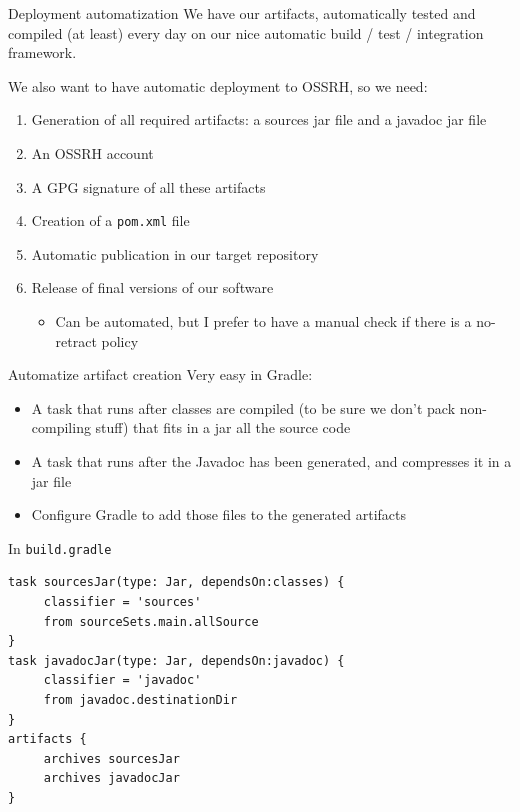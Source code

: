 \documentclass[presentation]{beamer}
\begin{document}
\begin{frame}[fragile]{Deployment automatization}
	We have our artifacts, automatically tested and compiled (at least) every day on our nice automatic build / test / integration framework.
	
	We also want to have automatic deployment to OSSRH, so we need:
	\begin{enumerate}
		\item Generation of all required artifacts: a sources jar file and a javadoc jar file
		\item An OSSRH account
		\item A GPG signature of all these artifacts
		\item Creation of a \texttt{pom.xml} file
		\item Automatic publication in our target repository
		\item Release of final versions of our software
		\begin{itemize}
			\item Can be automated, but I prefer to have a manual check if there is a no-retract policy
		\end{itemize}
	\end{enumerate}
\end{frame}

\begin{frame}[fragile]{Automatize artifact creation}
	Very easy in Gradle:
	\begin{itemize}
		\item A task that runs after classes are compiled (to be sure we don't pack non-compiling stuff) that fits in a jar all the source code
		\item A task that runs after the Javadoc has been generated, and compresses it in a jar file
		\item Configure Gradle to add those files to the generated artifacts
	\end{itemize}
	\begin{block}{In \texttt{build.gradle}}
		\begin{verbatim}
task sourcesJar(type: Jar, dependsOn:classes) {
     classifier = 'sources' 
     from sourceSets.main.allSource 
} 
task javadocJar(type: Jar, dependsOn:javadoc) { 
     classifier = 'javadoc' 
     from javadoc.destinationDir 
} 
artifacts { 
     archives sourcesJar 
     archives javadocJar 
}
		\end{verbatim}
	\end{block}
\end{frame}
\end{document}
